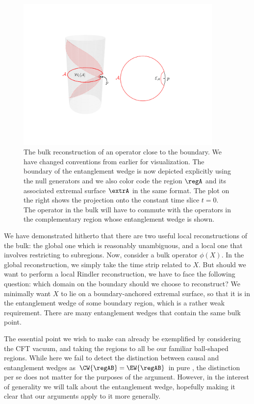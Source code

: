 \documentclass[12pt,openany]{book}
\begin{document}
\begin{figure}[ht!]
\begin{center}
\includegraphics[width=4in]{figures/ecc-edge}
\caption{ The bulk reconstruction of an operator close to the boundary. We have changed conventions from earlier for visualization. The boundary of the entanglement wedge is now depicted explicitly using the null generators and we also color code the region $\regA$ and its associated extremal surface $\extrA$ in the same format.  The plot on the right shows the projection onto the constant time slice $t=0$.
The operator in the bulk will have to commute with the operators in the complementary region whose entanglement wedge is shown.}
\label{f:errorC}
\end{center}
\end{figure}
%



We have demonstrated hitherto that there are two useful local reconstructions of the bulk: the global one which is reasonably unambiguous, and a local one that involves restricting to subregions. Now, consider a bulk operator $\phi(X)$. In the global reconstruction, we simply take the time strip related to $X$. But should we want to perform a local Rindler reconstruction, we have to face the following question: which domain on the boundary should we choose to reconstruct? We minimally want $X$ to lie on a boundary-anchored extremal surface, so that it is in the entanglement wedge of some  boundary region, which is a rather weak requirement. There are many entanglement wedges that contain the same bulk point.

The essential point we wish to make can  already be exemplified by considering the CFT vacuum, and taking the regions to all be our familiar ball-shaped regions. While here  we fail to detect the distinction between causal and entanglement wedges as $\CW{{\regAB}} = \EW{{\regAB}}$ in pure , the distinction per se does not matter for the purposes of the argument. However, in the interest of  generality we will talk about the entanglement wedge, hopefully making it clear that our arguments apply to it more generally.
\end{document}
